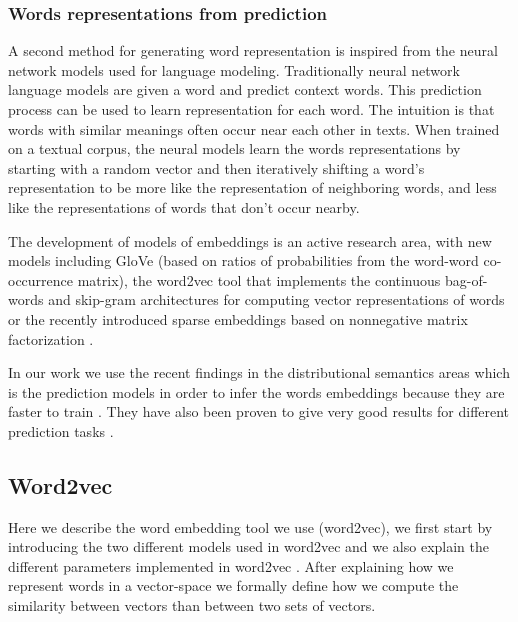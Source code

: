 \documentclass{article}
\begin{document}
\subsubsection{Words representations from prediction}
A second method for generating word representation is inspired from the neural network models used for language modeling. Traditionally neural network language models are given a word and predict context words. This
prediction process can be used to learn representation for each word. The intuition is that words with similar meanings often occur near each other in texts. 
When trained on a textual corpus, the neural models learn the words representations by starting with a random vector and
then iteratively shifting a word's representation to be more like the representation of neighboring words, and less like the representations of words that don't occur nearby.

The development of models of embeddings is an active research area, with new models including GloVe \cite{glove:2014} (based on ratios of probabilities from the word-word co-occurrence matrix), the word2vec tool \cite{mikolov:2013} that implements  the continuous bag-of-words and skip-gram architectures for computing vector representations of words or the recently introduced sparse embeddings based on nonnegative matrix factorization \cite{fyshe:2015}.

In our work we use the recent findings in the distributional semantics areas which is the prediction models in order to infer the words embeddings because they are faster to train  \cite{levy:2015, mikolov:2013}. They have also been proven to give very good results for different prediction tasks  \cite{ collobert:2011, fyshe:2015}.

\subsection{Word2vec}
Here we describe the word embedding tool we use (word2vec), we first start by introducing the two different models used in word2vec and we also explain the different parameters implemented in word2vec .
After explaining how we represent words in a vector-space we formally define how we compute the similarity between vectors than between two sets of vectors.
\end{document}
